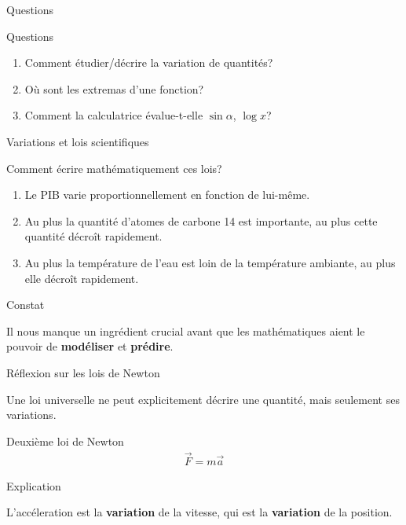 \documentclass{beamer}
\begin{document}
\begin{frame}
    {Questions}

    \begin{exampleblock}
        {Questions}

        \begin{enumerate}
            \item Comment étudier/décrire la variation de quantités?
                \pause{}
            \item Où sont les extremas d'une fonction?
                \pause{}
            \item Comment la calculatrice évalue-t-elle $\sin \alpha$, $\log x$?
        \end{enumerate}
    \end{exampleblock}
\end{frame}

\begin{frame}
    {Variations et lois scientifiques}

    Comment écrire mathématiquement ces lois?

    \begin{enumerate}
        \item Le PIB varie proportionnellement en fonction de lui-même.
            \pause{}
        \item Au plus la quantité d'atomes de carbone 14 est importante, au plus cette quantité décroît rapidement.
            \pause{}
        \item Au plus la température de l'eau est loin de la température ambiante, au plus elle décroît rapidement.
    \end{enumerate}

    \pause{}
    \begin{alertblock}
        {Constat}

        Il nous manque un ingrédient crucial avant que les mathématiques aient le pouvoir de \textbf{modéliser} et \textbf{prédire}.
    \end{alertblock}
\end{frame}

\begin{frame}
    {Réflexion sur les lois de Newton}

    Une loi universelle ne peut explicitement décrire une quantité,
    mais seulement ses variations.

    \begin{alertblock}
        {Deuxième loi de Newton}
        \begin{align*}
            \vec F = m \vec a
        \end{align*}
    \end{alertblock}
    \pause{}

    \begin{exampleblock}
        {Explication}

        L'accéleration est la \textbf{variation} de la vitesse,
        qui est la \textbf{variation} de la position.
    \end{exampleblock}
\end{frame}
\end{document}
